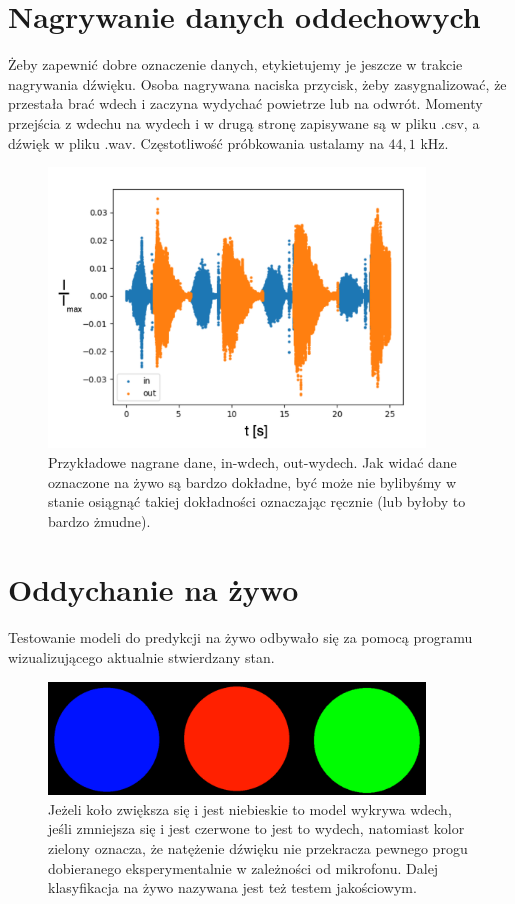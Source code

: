 \documentclass[polish]{article}
\begin{document}
\section{Nagrywanie danych oddechowych}
Żeby zapewnić dobre oznaczenie danych, etykietujemy je jeszcze w trakcie nagrywania dźwięku. 
Osoba nagrywana naciska przycisk, żeby zasygnalizować, że przestała brać wdech i zaczyna wydychać 
powietrze lub na odwrót. Momenty przejścia z wdechu na wydech i w drugą stronę zapisywane są w pliku
.csv, a dźwięk w pliku .wav. Częstotliwość próbkowania ustalamy na $44,1$ kHz.
\begin{figure}[H]
	\centering
	\includegraphics[width=10cm]{nagrywanie_ozn}
	\caption{Przykładowe nagrane dane, in-wdech, out-wydech. Jak widać dane oznaczone na żywo są bardzo dokładne, być może nie bylibyśmy w stanie osiągnąć takiej
dokładności oznaczając ręcznie (lub byłoby to bardzo żmudne).}
\end{figure}
\section{Oddychanie na żywo}
Testowanie modeli do predykcji na żywo odbywało się za pomocą programu wizualizującego aktualnie
stwierdzany stan. 
\begin{figure}[H]
	\centering
	\includegraphics[width=10cm]{wdechwydechcisza}
	\caption{Jeżeli koło zwiększa się i jest niebieskie to model wykrywa wdech, jeśli zmniejsza się i jest
czerwone to jest to wydech, natomiast kolor zielony oznacza, że natężenie dźwięku nie przekracza pewnego 
progu dobieranego eksperymentalnie w zależności od mikrofonu.
Dalej klasyfikacja na żywo nazywana jest też testem jakościowym.}
\end{figure}
\end{document}
